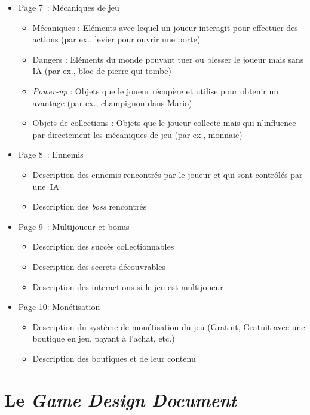 \begin{table}[H]
\begin{framed}
\begin{itemize}
\begin{itemize}
    \end{itemize}
    \item Page 7~:  Mécaniques de jeu
    \begin{itemize}
        \item Mécaniques : Eléments avec lequel un joueur interagit pour effectuer des actions (par ex., levier pour ouvrir une porte)
        \item Dangers : Eléments du monde pouvant tuer ou blesser le joueur mais sans IA (par ex., bloc de pierre qui tombe)
        \item \emph{Power-up} : Objets que le joueur récupère et utilise pour obtenir un avantage (par ex., champignon dans Mario)
        \item Objets de collections : Objets que le joueur collecte mais qui n'influence par directement les mécaniques de jeu (par ex.,  monnaie)
    \end{itemize}
    \item Page 8~: Ennemis
    \begin{itemize}
        \item Description des ennemis rencontrés par le joueur et qui sont contrôlés par une~IA
        \item Description des \emph{boss} rencontrés
    \end{itemize}
    \item Page 9~: Multijoueur et bonus
    \begin{itemize}
        \item Description des succès collectionnables
        \item Description des secrets découvrables
        \item Description des interactions si le jeu est multijoueur
    \end{itemize}
    \item Page 10: Monétisation
    \begin{itemize}
        \item Description du système de monétisation du jeu (Gratuit, Gratuit avec une boutique en jeu, payant à l'achat, etc.)
        \item Description des boutiques et de leur contenu
    \end{itemize}
\end{itemize}
\end{framed}
\label{Ten-Pager.table}
\end{table}




\section{Le \emph{Game Design Document}}
\label{sect.GDD}

